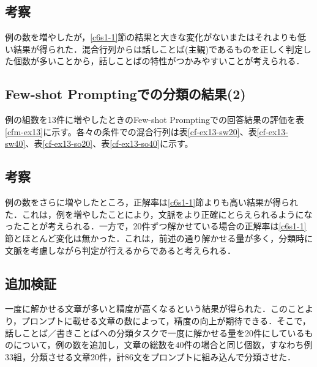 \subsection{考察}
例の数を増やしたが，\ref{c6s1-1}節の結果と大きな変化がないまたはそれよりも低い結果が得られた．混合行列からは話しことば(主観)であるものを正しく判定した個数が多いことから，話しことばの特性がつかみやすいことが考えられる．

\subsection{Few-shot Promptingでの分類の結果(2) \label{c6s1-3}}
例の組数を13件に増やしたときのFew-shot Promptingでの回答結果の評価を表\ref{cfm-ex13}に示す。各々の条件での混合行列は表\ref{cf-ex13-sw20}、表\ref{cf-ex13-sw40}、表\ref{cf-ex13-so20}、表\ref{cf-ex13-so40}に示す。







\subsection{考察}
例の数をさらに増やしたところ，正解率は\ref{c6s1-1}節よりも高い結果が得られた．これは，例を増やしたことにより，文脈をより正確にとらえられるようになったことが考えられる．一方で，20件ずつ解かせている場合の正解率は\ref{c6s1-1}節とほとんど変化は無かった．これは，前述の通り解かせる量が多く，分類時に文脈を考慮しながら判定が行えるからであると考えられる．

\subsection{追加検証}
一度に解かせる文章が多いと精度が高くなるという結果が得られた．このことより，プロンプトに載せる文章の数によって，精度の向上が期待できる．そこで，話しことば／書きことばへの分類タスクで一度に解かせる量を20件にしているものについて，例の数を追加し，文章の総数を40件の場合と同じ個数，すなわち例33組，分類させる文章20件，計86文をプロンプトに組み込んで分類させた．